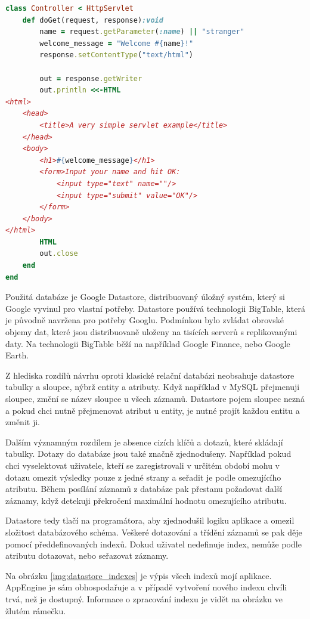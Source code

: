 \documentclass[bc,male,java,dept456]{diploma}						%
\begin{document}
\begin{lstlisting}[label=src:fib_mirah,caption=Hello World servlet v Mirah,language=Ruby]
class Controller < HttpServlet
	def doGet(request, response):void
		name = request.getParameter(:name) || "stranger"
		welcome_message = "Welcome #{name}!"
		response.setContentType("text/html")
 
		out = response.getWriter
		out.println <<-HTML
<html>
	<head>
		<title>A very simple servlet example</title>
	</head>
	<body>
		<h1>#{welcome_message}</h1>
		<form>Input your name and hit OK:
			<input type="text" name=""/>
			<input type="submit" value="OK"/>
		</form>
	</body>
</html>
		HTML
		out.close
	end
end
\end{lstlisting}

Použitá databáze je Google Datastore, distribuovaný úložný systém, který si Google vyvinul pro vlastní potřeby. Datastore používá technologii BigTable\cite{bigtable}, která je původně navržena pro potřeby Googlu. Podmínkou bylo zvládat obrovské objemy dat, které jsou distribuovaně uloženy na tisících serverů s replikovanými daty. Na technologii BigTable běží na například Google Finance, nebo Google Earth.

Z hlediska rozdílů návrhu oproti klasické relační databázi neobsahuje datastore tabulky a sloupce, nýbrž entity a atributy. Když například v MySQL přejmenuji sloupec, změní se název sloupce u všech záznamů. Datastore pojem sloupec nezná a pokud chci nutně přejmenovat atribut u entity, je nutné projít každou entitu a změnit ji.

Dalším významným rozdílem je absence cizích klíčů a dotazů, které skládají tabulky. Dotazy do databáze jsou také značně zjednodušeny. Například pokud chci vyselektovat uživatele, kteří se zaregistrovali v určitém období mohu v dotazu omezit výsledky pouze z jedné strany a seřadit je podle omezujícího atributu. Během posílání záznamů z databáze pak přestanu požadovat další záznamy, když detekuji překročení maximální hodnotu omezujícího atributu.

Datastore tedy tlačí na programátora, aby zjednodušil logiku aplikace a omezil slo\-ži\-tost databázového schéma. Veškeré dotazování a třídění záznamů se pak děje pomocí před\-de\-fi\-no\-va\-ných indexů. Dokud uživatel nedefinuje index, nemůže podle atributu dotazovat, nebo seřazovat záznamy.

Na obrázku \ref{img:datastore_indexes} je výpis všech indexů mojí aplikace. AppEngine je sám obhospodařuje a v případě vytvoření nového indexu chvíli trvá, než je dostupný. Informace o zpracování indexu je vidět na obrázku ve žlutém rámečku.
\end{document}
